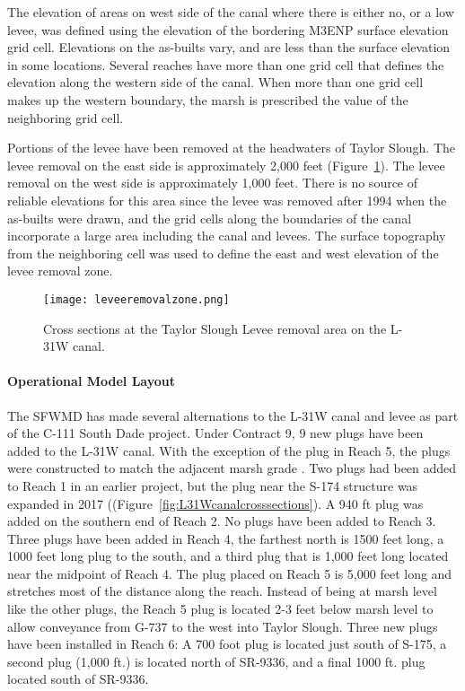 The elevation of areas on west side of the canal where there is either no, or a low levee, was defined using the elevation of the bordering M3ENP surface elevation grid cell.  Elevations on the as-builts vary, and are less than the surface elevation in some locations.  Several reaches have more than one grid cell that defines the elevation along the western side of the canal.  When more than one grid cell makes up the western boundary, the marsh is prescribed the value of the neighboring grid cell.

Portions of the levee have been removed at the headwaters of Taylor Slough.  The levee removal on the east side is approximately 2,000 feet (Figure~\ref{fig:LeveeRemovalZone}).  The levee removal on the west side is approximately 1,000 feet.  There is no source of reliable elevations for this area since the levee was removed after 1994 when the as-builts were drawn, and the grid cells along the boundaries of the canal incorporate a large area including the canal and levees.  The surface topography from the neighboring cell was used to define the east and west elevation of the levee removal zone.

\begin{figure}[!h]
  \begin{center}
  \texttt{[image: leveeremovalzone.png]}
  \caption[Cross sections at the Taylor Slough Levee removal area on the L-31W canal.]{Cross sections at the Taylor Slough Levee removal area on the L-31W canal.}
  \label{fig:LeveeRemovalZone}
  \end{center}
\end{figure}

\paragraph{Operational Model Layout}

The SFWMD has made several alternations to the L-31W canal and levee as part of the C-111 South Dade project.  Under Contract 9, 9 new plugs have been added to the L-31W canal.  With the exception of the plug in Reach 5, the plugs were constructed to match the adjacent marsh grade \citep{USACE2016C111SD}.  Two plugs had been added to Reach 1 in an earlier project, but the plug near the S-174 structure was expanded in 2017 ((Figure~\ref{fig:L31Wcanalcrosssections}).  A 940 ft plug was added on the southern end of Reach 2.  No plugs have been added to Reach 3.  Three plugs have been added in Reach 4, the farthest north is 1500 feet long, a 1000 feet long plug to the south, and a third plug that is 1,000 feet long located near the midpoint of Reach 4.  The plug placed on Reach 5 is 5,000 feet long and stretches most of the distance along the reach.   Instead of being at marsh level like the other plugs, the Reach 5 plug is located 2-3 feet below marsh level to allow conveyance from G-737 to the west into Taylor Slough.  Three new plugs have been installed in Reach 6: A 700 foot plug is located just south of S-175, a second plug (1,000 ft.) is located north of SR-9336, and a final 1000 ft. plug located south of SR-9336.

